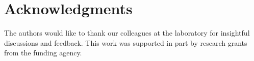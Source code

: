 \section*{Acknowledgments}
\label{sec:acknowledgments}

The authors would like to thank our colleagues at the laboratory for insightful discussions and feedback. This work was supported in part by research grants from the funding agency.

